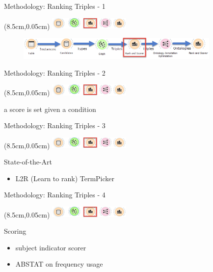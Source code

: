 \documentclass{beamer}
\begin{document}
\begin{frame}{Methodology: Ranking Triples - 1}
	\begin{textblock*}{4cm}(8.5cm,0.05cm) %
		\includegraphics[width=4cm]{images/header-rank-triples.png}
	\end{textblock*}
	\begin{figure}
		\includegraphics[width=10cm]{images/diagrams-rank-scorer.png}
	\end{figure}
\end{frame}
\begin{frame}{Methodology: Ranking Triples - 2}
	\begin{textblock*}{4cm}(8.5cm,0.05cm) %
		\includegraphics[width=4cm]{images/header-rank-triples.png}
	\end{textblock*}
	\begin{definition}
		a score is set given a condition
	\end{definition}
\end{frame}
\begin{frame}{Methodology: Ranking Triples - 3}
	\begin{textblock*}{4cm}(8.5cm,0.05cm) %
		\includegraphics[width=4cm]{images/header-rank-triples.png}
	\end{textblock*}
	State-of-the-Art
	\begin{itemize}
		\item L2R (Learn to rank) TermPicker
	\end{itemize}
\end{frame}
\begin{frame}{Methodology: Ranking Triples - 4}
	\begin{textblock*}{4cm}(8.5cm,0.05cm) %
		\includegraphics[width=4cm]{images/header-rank-triples.png}
	\end{textblock*}
	Scoring
	\begin{itemize}
		\item subject indicator scorer
		\item ABSTAT on frequency usage
	\end{itemize}
\end{frame}
\end{document}
